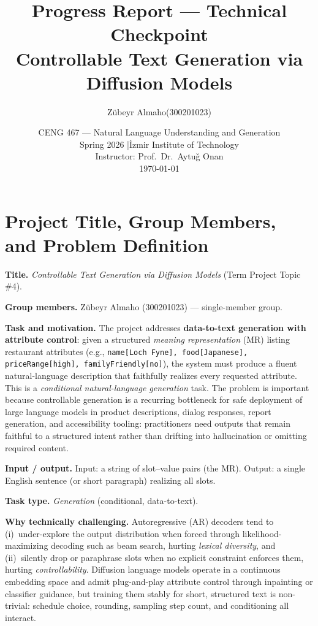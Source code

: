 \documentclass[11pt,a4paper]{article}
\title{\vspace{-1.4cm}\textbf{Progress Report --- Technical Checkpoint}\\[0.3em]
\large Controllable Text Generation via Diffusion Models}
\author{Z\"ubeyr Almaho\quad(300201023)}
\date{CENG 467 --- Natural Language Understanding and Generation\\
      Spring 2026 \quad|\quad \.{I}zmir Institute of Technology\\
      Instructor: Prof.\ Dr.\ Aytu\v{g} Onan\\[0.4em]\today}
\begin{document}
\maketitle
\vspace{-1em}

\section{Project Title, Group Members, and Problem Definition}

\textbf{Title.} \emph{Controllable Text Generation via Diffusion Models}
(Term Project Topic \#4).

\textbf{Group members.} Z\"ubeyr Almaho (300201023) --- single-member group.

\textbf{Task and motivation.} The project addresses
\textbf{data-to-text generation with attribute control}: given a structured
\emph{meaning representation} (MR) listing restaurant attributes (e.g.,
\texttt{name[Loch~Fyne], food[Japanese], priceRange[high],
familyFriendly[no]}), the system must produce a fluent natural-language
description that faithfully realizes every requested attribute. This is a
\emph{conditional natural-language generation} task. The problem is important
because controllable generation is a recurring bottleneck for safe deployment
of large language models in product descriptions, dialog responses,
report generation, and accessibility tooling: practitioners need outputs that
remain faithful to a structured intent rather than drifting into hallucination
or omitting required content.

\textbf{Input / output.} Input: a string of slot--value pairs (the MR).
Output: a single English sentence (or short paragraph) realizing all slots.

\textbf{Task type.} \emph{Generation} (conditional, data-to-text).

\textbf{Why technically challenging.}
Autoregressive (AR) decoders tend to (i)~under-explore the output distribution
when forced through likelihood-maximizing decoding such as beam search, hurting
\emph{lexical diversity}, and (ii)~silently drop or paraphrase slots when no
explicit constraint enforces them, hurting \emph{controllability}. Diffusion
language models operate in a continuous embedding space and admit
plug-and-play attribute control through inpainting or classifier guidance, but
training them stably for short, structured text is non-trivial: schedule
choice, rounding, sampling step count, and conditioning all interact.
\end{document}

